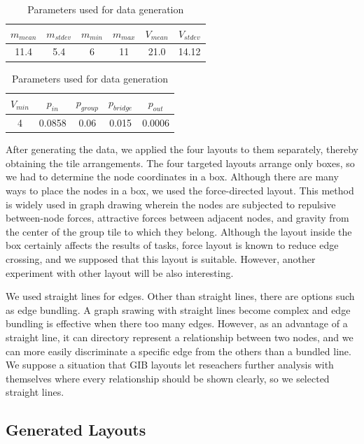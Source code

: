 \documentclass{vgtc}                          %
\begin{document}
\begin{table}[h]
  \begin{center}
  \caption{Parameters used for data generation}
    \begin{tabular}{|c|c|c|c|c|c|} \hline
      $m_{mean}$ & $m_{stdev}$ & $m_{min}$ & $m_{max}$ & $V_{mean}$ & $V_{stdev}$ \\ \hline 
      11.4 & 5.4 & 6 & 11 & 21.0 & 14.12 \\ \hline
    \end{tabular}
    \begin{tabular}{|c|c|c|c|c|} \hline
      $V_{min}$ & $p_{in}$ & $p_{group}$ & $p_{bridge}$ & $p_{out}$ \\ \hline
      4 & 0.0858 & 0.06 & 0.015 & 0.0006 \\ \hline
    \end{tabular}
  \end{center}
  \label{params}
\end{table}

After generating the data, we applied the four layouts to them separately, thereby obtaining the tile arrangements.
The four targeted layouts arrange only boxes, so we had to determine the node coordinates in a box.
Although there are many ways to place the nodes in a box, we used the force-directed layout.
This method is widely used in graph drawing wherein the nodes are subjected to repulsive between-node forces, attractive forces between adjacent nodes, and gravity from the center of the group tile to which they belong.
Although the layout inside the box certainly affects the results of tasks, force layout is known to reduce edge crossing, and we supposed that this layout is suitable.
However, another experiment with other layout will be also interesting.

We used straight lines for edges.
Other than straight lines, there are options such as edge bundling.
A graph srawing with straight lines become complex and edge bundling is effective when there too many edges.
However, as an advantage of a straight line, it can directory represent a relationship between two nodes, and we can more easily discriminate a specific edge from the others than a bundled line.
We suppose a situation that GIB layouts let reseachers further analysis with themselves where every relationship should be shown clearly, so we selected straight lines.

\subsection{Generated Layouts}
\label{computation}
\end{document}

